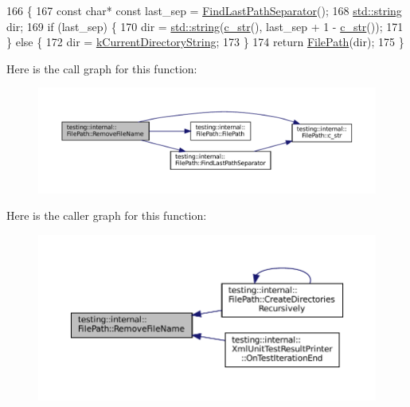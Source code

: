 \begin{DoxyCode}
166                                         \{
167   \textcolor{keyword}{const} \textcolor{keywordtype}{char}* \textcolor{keyword}{const} last\_sep = \hyperlink{classtesting_1_1internal_1_1FilePath_ab47f288e1e9ce5a904eccb94e86c4f99}{FindLastPathSeparator}();
168   \hyperlink{namespacetesting_1_1internal_a8e8ff5b11e64078831112677156cb111}{std::string} dir;
169   \textcolor{keywordflow}{if} (last\_sep) \{
170     dir = \hyperlink{namespacetesting_1_1internal_a8e8ff5b11e64078831112677156cb111}{std::string}(\hyperlink{classtesting_1_1internal_1_1FilePath_a43e9ff978b0d7c43c401d976d4621aa3}{c\_str}(), last\_sep + 1 - \hyperlink{classtesting_1_1internal_1_1FilePath_a43e9ff978b0d7c43c401d976d4621aa3}{c\_str}());
171   \} \textcolor{keywordflow}{else} \{
172     dir = \hyperlink{namespacetesting_1_1internal_a23a8e9527d0e544e7df2d64ad549ce3e}{kCurrentDirectoryString};
173   \}
174   \textcolor{keywordflow}{return} \hyperlink{classtesting_1_1internal_1_1FilePath_a3504a51accbca78a52fe586133ea5499}{FilePath}(dir);
175 \}
\end{DoxyCode}
Here is the call graph for this function\+:
\nopagebreak
\begin{figure}[H]
\begin{center}
\leavevmode
\includegraphics[width=350pt]{classtesting_1_1internal_1_1FilePath_a49e030b5a62ca7dcc7f920a63a96fa55_cgraph}
\end{center}
\end{figure}
Here is the caller graph for this function\+:
\nopagebreak
\begin{figure}[H]
\begin{center}
\leavevmode
\includegraphics[width=350pt]{classtesting_1_1internal_1_1FilePath_a49e030b5a62ca7dcc7f920a63a96fa55_icgraph}
\end{center}
\end{figure}
